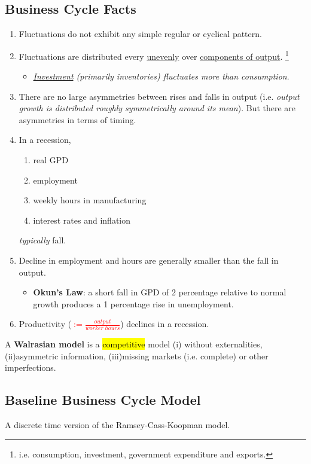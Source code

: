 \documentclass[11pt]{article}
\begin{document}
		\subsection{Business Cycle Facts}
			\begin{enumerate}
				\item Fluctuations do not exhibit any simple regular or cyclical pattern.
				\item Fluctuations are distributed every \ul{unevenly} over \ul{components of output}. \footnote{i.e. consumption, investment, government expenditure and exports.} \begin{itemize}
						\item \emph{\ul{Investment} (primarily inventories) fluctuates more than consumption}.	
 						\end{itemize}
				\item There are no large asymmetries between rises and falls in output (i.e. \emph{output growth is distributed roughly symmetrically around its mean}). But there are asymmetries in terms of timing.
				\item In a recession,
					\begin{enumerate}
						\item real GPD
						\item employment
						\item weekly hours in manufacturing
						\item interest rates and inflation		
					\end{enumerate} \emph{typically} fall.
				\item Decline in employment and hours are generally smaller than the fall in output.
					\begin{itemize}
						\item \textbf{Okun's Law}: a short fall in GPD of 2 percentage relative to normal growth produces a 1 percentage rise in unemployment.
					\end{itemize}
				\item Productivity (\textcolor{red}{$:=\frac{output}{worker\ hours}$}) declines in a recession.
			\end{enumerate}
			
			\begin{definition}
				A \textbf{Walrasian model} is a \hl{competitive} model (i) without externalities, (ii)asymmetric information, (iii)missing markets (i.e. complete) or other imperfections.
			\end{definition}
		\subsection{Baseline Business Cycle Model}
			\par A discrete time version of the Ramsey-Cass-Koopman model.
\end{document}
